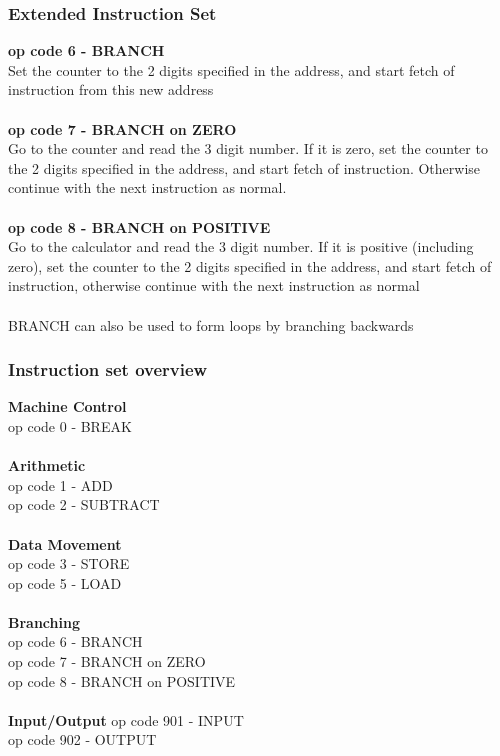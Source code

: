 \documentclass{article}[18pt]
\begin{document}
\subsubsection{Extended Instruction Set}
\textbf{op code 6 - BRANCH}\\
Set the counter to the 2 digits specified in the address, and start fetch of instruction from this new address\\
\\
\textbf{op code 7 - BRANCH on ZERO}\\
Go to the counter and read the 3 digit number. If it is zero, set the counter to the 2 digits specified in the address, and start fetch of instruction. Otherwise continue with the next instruction as normal.\\
\\
\textbf{op code 8 - BRANCH on POSITIVE}\\
Go to the calculator and read the 3 digit number. If it is positive (including zero), set the counter to the 2 digits specified in the address, and start fetch of instruction, otherwise continue with the next instruction as normal\\
\\
BRANCH can also be used to form loops by branching backwards
\subsubsection{Instruction set overview}
\textbf{Machine Control}\\
op code 0 - BREAK\\
\\
\textbf{Arithmetic}\\
op code 1 - ADD\\
op code 2 - SUBTRACT\\
\\
\textbf{Data Movement}\\
op code 3 - STORE\\
op code 5 - LOAD\\
\\
\textbf{Branching}\\
op code 6 - BRANCH\\
op code 7 - BRANCH on ZERO\\
op code 8 - BRANCH on POSITIVE\\
\\
\textbf{Input/Output}
op code 901 - INPUT\\
op code 902 - OUTPUT
\end{document}
